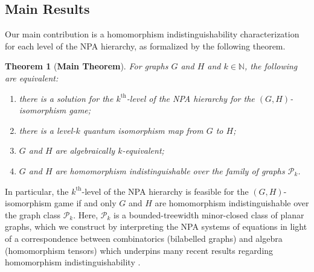 \documentclass[a4paper,onecolumn,11pt,accepted=2026-01-06]{quantumarticle}
\theoremstyle{plain}
\newtheorem{thm}{Theorem}[section]
\theoremstyle{remark}
\theoremstyle{definition}
\def\calP{{\mathcal P}} \def\calQ{{\mathcal Q}} \def\calR{{\mathcal R}}
\begin{document}
\subsection{Main Results}

Our main contribution is a homomorphism indistinguishability characterization for each level of the NPA hierarchy, as formalized by the following theorem.
\begin{thm}[\textbf{Main Theorem}]\label{thm:main-theorem}
    For graphs $G$ and $H$ and $k \in \mathbb{N}$, the following are equivalent:
    \begin{enumerate}[label = (\roman*)]
        \item there is a solution for the $k^{\text{th}}$-level of the NPA hierarchy for the $(G,H)$-isomorphism game;
        \item there is a level-$k$ quantum isomorphism map from $G$ to $H$;\label{ref1}
        \item $G$ and $H$ are algebraically $k$-equivalent;\label{ref2}
        \item $G$ and $H$ are homomorphism indistinguishable over the family of graphs $\calP_k$. 
    \end{enumerate}
\end{thm}
In particular, the $k^{\text{th}}$-level of the NPA hierarchy is feasible for the $(G,H)$-isomorphism game if and only $G$ and $H$ are homomorphism indistinguishable over the graph class $\calP_k$. 
Here, $\mathcal{P}_k$ is a bounded-treewidth minor-closed class of planar graphs, which we construct by interpreting the NPA systems of equations in light of a correspondence between combinatorics (bilabelled graphs) and algebra (homomorphism tensors) which underpins many recent results regarding homomorphism indistinguishability \cite{david-laura,grohe_homomorphism_2022,rattan_weisfeiler_2023,roberson-seppelt-arxiv}.
\end{document}
